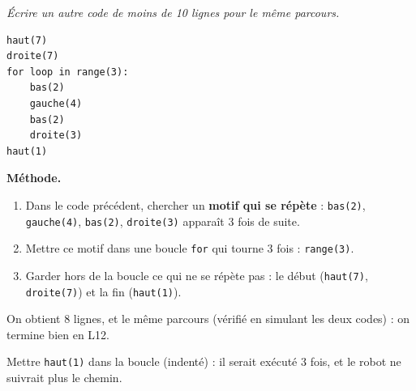 \documentclass[addpoints, 11pt]{exam}
\newcommand{\enonce}[1]{\textit{#1}\par\smallskip}
\newcommand{\methode}{\par\smallskip\noindent\textbf{Méthode.}\ }
\newcommand{\code}[1]{\texttt{#1}}
\DeclareRobustCommand{\_}{\textunderscore\allowbreak}
\begin{document}
\begin{questions}
\question[1] \enonce{Écrire un autre code de moins de 10 lignes pour le même parcours.}
\begin{reponse}
\begin{lstlisting}
haut(7)
droite(7)
for loop in range(3):
    bas(2)
    gauche(4)
    bas(2)
    droite(3)
haut(1)
\end{lstlisting}
\end{reponse}
\methode
\begin{enumerate}
  \item Dans le code précédent, chercher un \textbf{motif qui se répète} : \code{bas(2)}, \code{gauche(4)}, \code{bas(2)}, \code{droite(3)} apparaît 3 fois de suite.
  \item Mettre ce motif dans une boucle \code{for} qui tourne 3 fois : \code{range(3)}.
  \item Garder hors de la boucle ce qui ne se répète pas : le début (\code{haut(7)}, \code{droite(7)}) et la fin (\code{haut(1)}).
\end{enumerate}
On obtient 8 lignes, et le même parcours (vérifié en simulant les deux codes) : on termine bien en L12.
\begin{erreur}
Mettre \code{haut(1)} dans la boucle (indenté) : il serait exécuté 3 fois, et le robot ne suivrait plus le chemin.
\end{erreur}

\end{questions}
\end{document}
